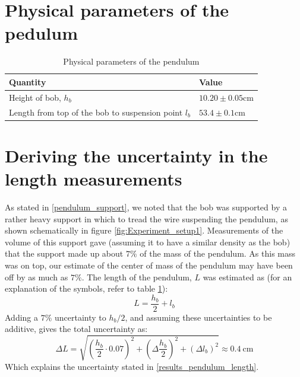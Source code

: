 \documentclass[a4paper, 10pt]{article}
\begin{document}
\begin{appendices}
\section{Physical parameters of the pedulum}\label{ap:physical_parameters}
\begin{table}[ht!]
\centering
\caption{Physical parameters of the pendulum}
\label{tab:physical_parameters_of_pendulum}
\begin{tabular}{|l|l|}
\hline
\textbf{Quantity}                              & \textbf{Value}                 \\
\hline
Height of bob, $h_b$                                  & $10.20\pm 0.05  \mathrm{cm}$  \\
Length from top of the bob to suspension point $l_b$ & $53.4 \pm 0.1 \mathrm{cm}$   \\
\hline 
\end{tabular}
\end{table}
\section{Deriving the uncertainty in the length measurements}\label{ap:uncertainty_in_length}
As stated in \ref{pendulum_support}, we noted that the bob was supported by a rather heavy support in which to tread the wire suspending the pendulum, as shown schematically in figure \ref{fig:Experiment_setup1}. Measurements of the volume of this support gave (assuming it to have a similar density as the bob) that the support made up about $7\%$ of the mass of the pendulum. As this mass was on top, our estimate of the center of mass of the pendulum may have been off by as much as $7\%$. The length of the pendulum, $L$ was estimated as (for an explanation of the symbols, refer to table \ref{tab:physical_parameters_of_pendulum}): 
$$L=\frac{h_b}{2}+l_b$$
Adding a $7\%$ uncertainty to $h_b/2$, and assuming these uncertainties to be additive, gives the total uncertainty as:
$$\Delta L = \sqrt{\left(\frac{h_b}{2}\cdot 0.07\right)^2+ \left(\Delta\frac{h_b}{2}\right)^2+(\Delta l_b)^2} \approx 0.4 \ \mathrm{cm} $$
Which explains the uncertainty stated in \ref{results_pendulum_length}.
\end{appendices}
\end{document}

